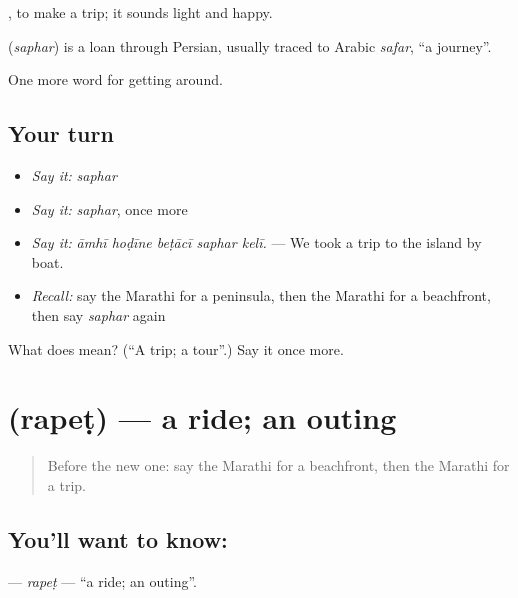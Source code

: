  , to make a trip; it sounds light and happy.

\begin{cousinweb}
\textbf{} (\emph{saphar}) is a loan through Persian, usually traced to Arabic \emph{safar}, \textquotedblleft{}a journey\textquotedblright{}.
\end{cousinweb}

\begin{grammarlens}[title={What you've built}]
One more word for getting around.
\end{grammarlens}

\subsection*{Your turn}
\begin{itemize}
\raggedright
  \item \emph{Say it:} \emph{saphar}
  \item \emph{Say it:} \emph{saphar}, once more
  \item \emph{Say it:} \emph{āmhī hoḍīne beṭācī saphar kelī.} — We took a trip to the island by boat.
  \item \emph{Recall:} say the Marathi for a peninsula, then the Marathi for a beachfront, then say \emph{saphar} again
\end{itemize}

\begin{tcolorbox}[breakable,colback=teal!4,colframe=teal!35!black,title={Before you move on}]
What does  mean? (\textquotedblleft{}A trip; a tour\textquotedblright{}.) Say it once more.
\end{tcolorbox}
\section[\texorpdfstring{\mr{रपेट} (rapeṭ)}{रपेट (rapeṭ)}]{ (rapeṭ) — a ride; an outing}

\label{lesson:MR-C411-rapet}



\begin{quote}
Before the new one: say the Marathi for a beachfront, then the Marathi for a trip.
\end{quote}

\subsection*{You'll want to know: }
\textbf{} — \emph{rapeṭ} — \textquotedblleft{}a ride; an outing\textquotedblright{}.

